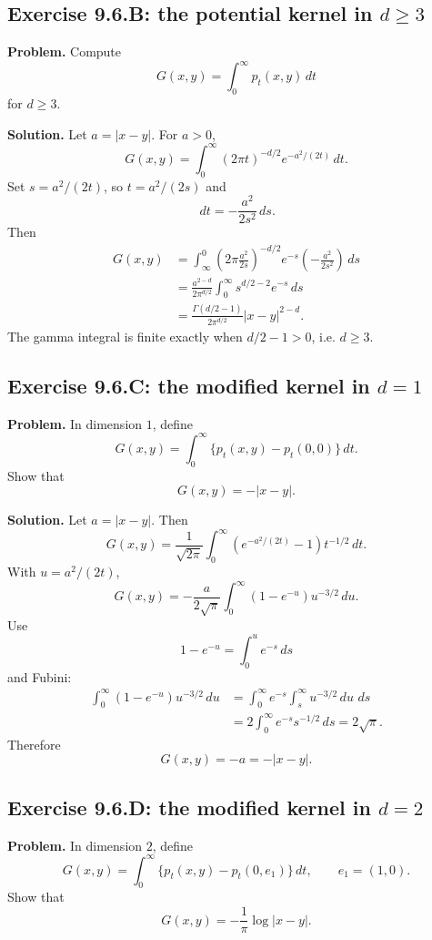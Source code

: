 \documentclass[11pt]{article}
\newcommand{\dd}{\,d}
\begin{document}
\subsection*{Exercise 9.6.B: the potential kernel in $d\ge3$}

\noindent\textbf{Problem.}
Compute
\[
  G(x,y)=\int_0^\infty p_t(x,y)\dd t
\]
for $d\ge3$.

\noindent\textbf{Solution.}
Let $a=|x-y|$.  For $a>0$,
\[
  G(x,y)=
  \int_0^\infty (2\pi t)^{-d/2}e^{-a^2/(2t)}\dd t.
\]
Set $s=a^2/(2t)$, so $t=a^2/(2s)$ and
\[
  \dd t=-\frac{a^2}{2s^2}\dd s.
\]
Then
\[
\begin{aligned}
  G(x,y)
  &=
  \int_\infty^0
  \left(2\pi\frac{a^2}{2s}\right)^{-d/2}
  e^{-s}
  \left(-\frac{a^2}{2s^2}\right)\dd s  \\
  &=
  \frac{a^{2-d}}{2\pi^{d/2}}
  \int_0^\infty s^{d/2-2}e^{-s}\dd s  \\
  &=
  \frac{\Gamma(d/2-1)}{2\pi^{d/2}}|x-y|^{2-d}.
\end{aligned}
\]
The gamma integral is finite exactly when $d/2-1>0$, i.e. $d\ge3$.

\subsection*{Exercise 9.6.C: the modified kernel in $d=1$}

\noindent\textbf{Problem.}
In dimension $1$, define
\[
  G(x,y)=\int_0^\infty\{p_t(x,y)-p_t(0,0)\}\dd t.
\]
Show that
\[
  G(x,y)=-|x-y|.
\]

\noindent\textbf{Solution.}
Let $a=|x-y|$.  Then
\[
  G(x,y)
  =
  \frac1{\sqrt{2\pi}}\int_0^\infty
  \left(e^{-a^2/(2t)}-1\right)t^{-1/2}\dd t.
\]
With $u=a^2/(2t)$,
\[
  G(x,y)
  =
  -\frac{a}{2\sqrt{\pi}}\int_0^\infty (1-e^{-u})u^{-3/2}\dd u.
\]
Use
\[
  1-e^{-u}=\int_0^u e^{-s}\dd s
\]
and Fubini:
\[
\begin{aligned}
  \int_0^\infty (1-e^{-u})u^{-3/2}\dd u
  &=
  \int_0^\infty e^{-s}\int_s^\infty u^{-3/2}\dd u\,\dd s  \\
  &=
  2\int_0^\infty e^{-s}s^{-1/2}\dd s
  =
  2\sqrt{\pi}.
\end{aligned}
\]
Therefore
\[
  G(x,y)=-a=-|x-y|.
\]

\subsection*{Exercise 9.6.D: the modified kernel in $d=2$}

\noindent\textbf{Problem.}
In dimension $2$, define
\[
  G(x,y)=\int_0^\infty\{p_t(x,y)-p_t(0,e_1)\}\dd t,
  \qquad e_1=(1,0).
\]
Show that
\[
  G(x,y)=-\frac1\pi\log|x-y|.
\]
\end{document}
